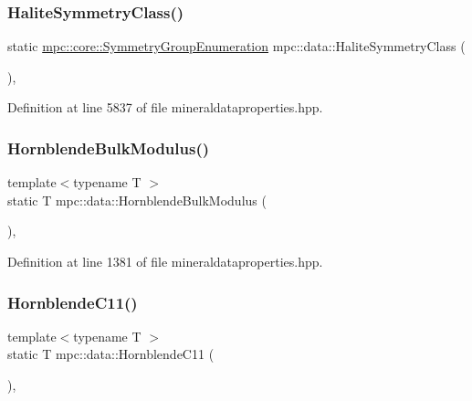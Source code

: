 \subsubsection{\texorpdfstring{Halite\+Symmetry\+Class()}{HaliteSymmetryClass()}}
{\footnotesize\ttfamily static \mbox{\hyperlink{namespacempc_1_1core_a9d979684062547055a0ef5c13077bad8}{mpc\+::core\+::\+Symmetry\+Group\+Enumeration}} mpc\+::data\+::\+Halite\+Symmetry\+Class (\begin{DoxyParamCaption}{ }\end{DoxyParamCaption})\hspace{0.3cm}{\ttfamily [inline]}, {\ttfamily [static]}}



Definition at line 5837 of file mineraldataproperties.\+hpp.

\mbox{\label{namespacempc_1_1data_a3592b863aa9d9a1a38530696f943daf9}} 
\subsubsection{\texorpdfstring{Hornblende\+Bulk\+Modulus()}{HornblendeBulkModulus()}}
{\footnotesize\ttfamily template$<$typename T $>$ \\
static T mpc\+::data\+::\+Hornblende\+Bulk\+Modulus (\begin{DoxyParamCaption}{ }\end{DoxyParamCaption})\hspace{0.3cm}{\ttfamily [inline]}, {\ttfamily [static]}}



Definition at line 1381 of file mineraldataproperties.\+hpp.

\mbox{\label{namespacempc_1_1data_a677609d3f66c51292db378a5abbba3e1}} 
\subsubsection{\texorpdfstring{Hornblende\+C11()}{HornblendeC11()}}
{\footnotesize\ttfamily template$<$typename T $>$ \\
static T mpc\+::data\+::\+Hornblende\+C11 (\begin{DoxyParamCaption}{ }\end{DoxyParamCaption})\hspace{0.3cm}{\ttfamily [inline]}, {\ttfamily [static]}}



